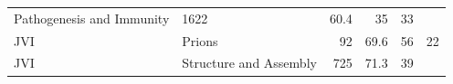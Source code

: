 \documentclass[11pt,]{article}
\begin{document}
\begin{longtable}[]{@{}llrrrr@{}}
\begin{minipage}[t]{0.43\columnwidth}
Pathogenesis and Immunity\strut
\end{minipage} & \begin{minipage}[t]{0.04\columnwidth}\raggedleft\strut
1622\strut
\end{minipage} & \begin{minipage}[t]{0.08\columnwidth}\raggedleft\strut
60.4\strut
\end{minipage} & \begin{minipage}[t]{0.11\columnwidth}\raggedleft\strut
35\strut
\end{minipage} & \begin{minipage}[t]{0.11\columnwidth}\raggedleft\strut
33\strut
\end{minipage}\tabularnewline
\begin{minipage}[t]{0.06\columnwidth}\raggedright\strut
JVI\strut
\end{minipage} & \begin{minipage}[t]{0.43\columnwidth}\raggedright\strut
Prions\strut
\end{minipage} & \begin{minipage}[t]{0.04\columnwidth}\raggedleft\strut
92\strut
\end{minipage} & \begin{minipage}[t]{0.08\columnwidth}\raggedleft\strut
69.6\strut
\end{minipage} & \begin{minipage}[t]{0.11\columnwidth}\raggedleft\strut
56\strut
\end{minipage} & \begin{minipage}[t]{0.11\columnwidth}\raggedleft\strut
22\strut
\end{minipage}\tabularnewline
\begin{minipage}[t]{0.06\columnwidth}\raggedright\strut
JVI\strut
\end{minipage} & \begin{minipage}[t]{0.43\columnwidth}\raggedright\strut
Structure and Assembly\strut
\end{minipage} & \begin{minipage}[t]{0.04\columnwidth}\raggedleft\strut
725\strut
\end{minipage} & \begin{minipage}[t]{0.08\columnwidth}\raggedleft\strut
71.3\strut
\end{minipage} & \begin{minipage}[t]{0.11\columnwidth}\raggedleft\strut
39\strut
\end{minipage} & \begin{minipage}[t]{0.11\columnwidth}\raggedleft\strut

\end{minipage}
\end{longtable}
\end{document}
